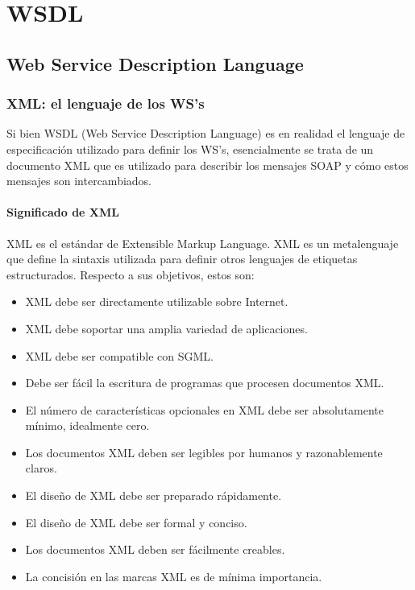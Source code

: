 \appendix
\chapter{WSDL}
\label{WSDL}

\section{Web Service Description Language}

\subsection{XML: el lenguaje de los WS's}

Si bien WSDL (Web Service Description Language) es en realidad el lenguaje de especificación utilizado para definir los WS's, esencialmente se trata de un documento XML que es utilizado para describir los mensajes SOAP y cómo estos mensajes son intercambiados.

\subsubsection*{Significado de XML}

XML es el estándar de Extensible Markup Language. XML es un metalenguaje que define la sintaxis utilizada para definir otros lenguajes de etiquetas estructurados.
Respecto a sus objetivos, estos son:

\begin{itemize}
	\item XML debe ser directamente utilizable sobre Internet.
	\item XML debe soportar una amplia variedad de aplicaciones.
	\item XML debe ser compatible con SGML.
	\item Debe ser fácil la escritura de programas que procesen documentos XML.
	\item El número de características opcionales en XML debe ser absolutamente mínimo, idealmente cero.
	\item Los documentos XML deben ser legibles por humanos y razonablemente claros.
	\item El diseño de XML debe ser preparado rápidamente.
	\item El diseño de XML debe ser formal y conciso.
	\item Los documentos XML deben ser fácilmente creables.
	\item La concisión en las marcas XML es de mínima importancia.
\end{itemize}


